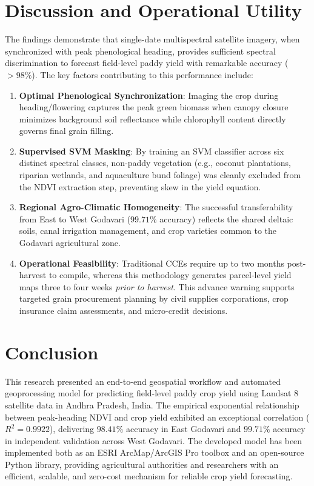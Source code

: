 \documentclass[11pt,a4paper]{article}
\begin{document}
\section{Discussion and Operational Utility}
The findings demonstrate that single-date multispectral satellite imagery, when synchronized with peak phenological heading, provides sufficient spectral discrimination to forecast field-level paddy yield with remarkable accuracy ($>98\%$). The key factors contributing to this performance include:
\begin{enumerate}
    \item \textbf{Optimal Phenological Synchronization}: Imaging the crop during heading/flowering captures the peak green biomass when canopy closure minimizes background soil reflectance while chlorophyll content directly governs final grain filling.
    \item \textbf{Supervised SVM Masking}: By training an SVM classifier across six distinct spectral classes, non-paddy vegetation (e.g., coconut plantations, riparian wetlands, and aquaculture bund foliage) was cleanly excluded from the NDVI extraction step, preventing skew in the yield equation.
    \item \textbf{Regional Agro-Climatic Homogeneity}: The successful transferability from East to West Godavari ($99.71\%$ accuracy) reflects the shared deltaic soils, canal irrigation management, and crop varieties common to the Godavari agricultural zone.
    \item \textbf{Operational Feasibility}: Traditional CCEs require up to two months post-harvest to compile, whereas this methodology generates parcel-level yield maps three to four weeks \textit{prior to harvest}. This advance warning supports targeted grain procurement planning by civil supplies corporations, crop insurance claim assessments, and micro-credit decisions.
\end{enumerate}

\section{Conclusion}
This research presented an end-to-end geospatial workflow and automated geoprocessing model for predicting field-level paddy crop yield using Landsat 8 satellite data in Andhra Pradesh, India. The empirical exponential relationship between peak-heading NDVI and crop yield exhibited an exceptional correlation ($R^2 = 0.9922$), delivering $98.41\%$ accuracy in East Godavari and $99.71\%$ accuracy in independent validation across West Godavari. The developed model has been implemented both as an ESRI ArcMap/ArcGIS Pro toolbox and an open-source Python library, providing agricultural authorities and researchers with an efficient, scalable, and zero-cost mechanism for reliable crop yield forecasting.
\end{document}
